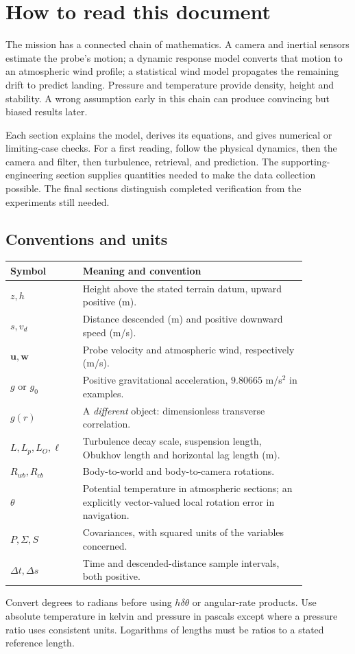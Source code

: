 \documentclass[11pt,a4paper]{article}
\numberwithin{equation}{section}
\begin{document}
\section{How to read this document}
\label{sec:guide}
The mission has a connected chain of mathematics. A camera and inertial sensors estimate the probe's motion; a dynamic response model converts that motion to an atmospheric wind profile; a statistical wind model propagates the remaining drift to predict landing. Pressure and temperature provide density, height and stability. A wrong assumption early in this chain can produce convincing but biased results later.

Each section explains the model, derives its equations, and gives numerical or limiting-case checks. For a first reading, follow the physical dynamics, then the camera and filter, then turbulence, retrieval, and prediction. The supporting-engineering section supplies quantities needed to make the data collection possible. The final sections distinguish completed verification from the experiments still needed.

\subsection{Conventions and units}
\begin{center}
\begin{tabular}{p{0.21\linewidth}p{0.65\linewidth}}
\toprule
Symbol & Meaning and convention\\
\midrule
$z,h$ & Height above the stated terrain datum, upward positive (m).\\
$s,v_d$ & Distance descended (m) and positive downward speed (m/s).\\
$\boldsymbol u,\boldsymbol w$ & Probe velocity and atmospheric wind, respectively (m/s).\\
$g$ or $g_0$ & Positive gravitational acceleration, $9.80665$ m/s$^2$ in examples.\\
$g(r)$ & A \emph{different} object: dimensionless transverse correlation.\\
$L,L_p,L_O,\ell$ & Turbulence decay scale, suspension length, Obukhov length and horizontal lag length (m).\\
$R_{wb},R_{cb}$ & Body-to-world and body-to-camera rotations.\\
$\theta$ & Potential temperature in atmospheric sections; an explicitly vector-valued local rotation error in navigation.\\
$P,\Sigma,S$ & Covariances, with squared units of the variables concerned.\\
$\Delta t,\Delta s$ & Time and descended-distance sample intervals, both positive.\\
\bottomrule
\end{tabular}
\end{center}
Convert degrees to radians before using $h\delta\theta$ or angular-rate products. Use absolute temperature in kelvin and pressure in pascals except where a pressure ratio uses consistent units. Logarithms of lengths must be ratios to a stated reference length.
\end{document}

